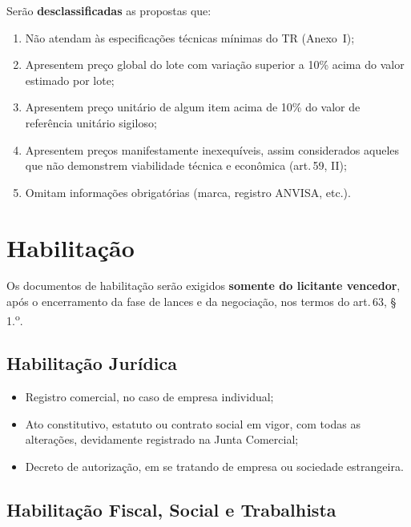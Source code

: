 \documentclass[12pt,a4paper]{article}
\newcommand{\art}[1]{art.\,#1}
\begin{document}
Serão \textbf{desclassificadas} as propostas que:

\begin{enumerate}
  \item Não atendam às especificações técnicas mínimas do TR (Anexo~I);
  \item Apresentem preço global do lote com variação superior a 10\% acima do
    valor estimado por lote;
  \item Apresentem preço unitário de algum item acima de 10\% do valor de
    referência unitário sigiloso;
  \item Apresentem preços manifestamente inexequíveis, assim considerados aqueles
    que não demonstrem viabilidade técnica e econômica (\art{59}, II);
  \item Omitam informações obrigatórias (marca, registro ANVISA, etc.).
\end{enumerate}

\section{Habilitação}

\begin{legalbox}
\small
Os documentos de habilitação serão exigidos \textbf{somente do licitante vencedor},
após o encerramento da fase de lances e da negociação, nos termos do \art{63},
\S\,1.\textsuperscript{o}.
\end{legalbox}

\subsection{Habilitação Jurídica}

\begin{itemize}
  \item Registro comercial, no caso de empresa individual;
  \item Ato constitutivo, estatuto ou contrato social em vigor, com todas as
    alterações, devidamente registrado na Junta Comercial;
  \item Decreto de autorização, em se tratando de empresa ou sociedade estrangeira.
\end{itemize}

\subsection{Habilitação Fiscal, Social e Trabalhista}
\end{document}
